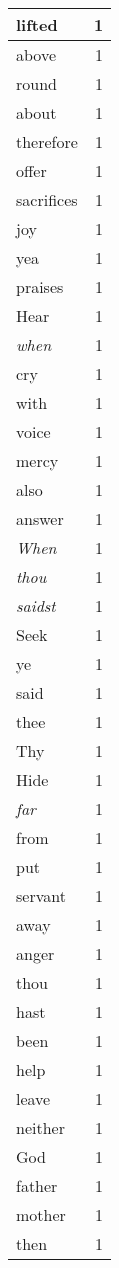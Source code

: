 \begin{center}
\begin{longtable}{l|r}
lifted & 1 \\ \hline
above & 1 \\ \hline
round & 1 \\ \hline
about & 1 \\ \hline
therefore & 1 \\ \hline
offer & 1 \\ \hline
sacrifices & 1 \\ \hline
joy & 1 \\ \hline
yea & 1 \\ \hline
praises & 1 \\ \hline
Hear & 1 \\ \hline
\emph{when} & 1 \\ \hline
cry & 1 \\ \hline
with & 1 \\ \hline
voice & 1 \\ \hline
mercy & 1 \\ \hline
also & 1 \\ \hline
answer & 1 \\ \hline
\emph{When} & 1 \\ \hline
\emph{thou} & 1 \\ \hline
\emph{saidst} & 1 \\ \hline
Seek & 1 \\ \hline
ye & 1 \\ \hline
said & 1 \\ \hline
thee & 1 \\ \hline
Thy & 1 \\ \hline
Hide & 1 \\ \hline
\emph{far} & 1 \\ \hline
from & 1 \\ \hline
put & 1 \\ \hline
servant & 1 \\ \hline
away & 1 \\ \hline
anger & 1 \\ \hline
thou & 1 \\ \hline
hast & 1 \\ \hline
been & 1 \\ \hline
help & 1 \\ \hline
leave & 1 \\ \hline
neither & 1 \\ \hline
God & 1 \\ \hline
father & 1 \\ \hline
mother & 1 \\ \hline
then & 1 \\ \hline

\end{longtable}
\end{center}

